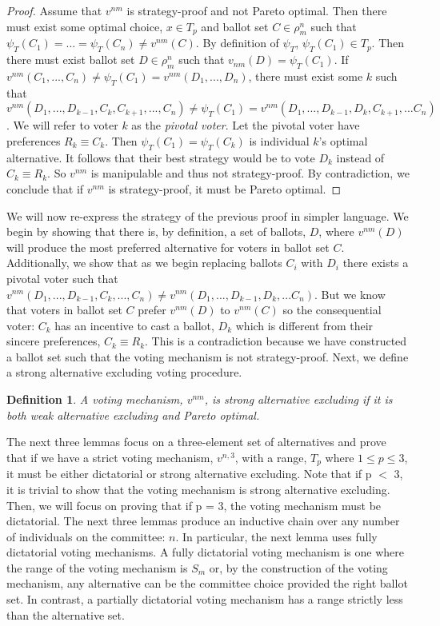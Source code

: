 \documentclass{amsart}
\newtheorem{definition}{Definition}
\theoremstyle{plain}
\begin{document}
\begin{proof}
    
Assume that $v^{nm}$ is strategy-proof and not Pareto optimal. Then there must exist some optimal choice, $x \in T_p$ and ballot set $C \in \rho_m^n$ such that $\psi_T(C_1) = ... = \psi_T(C_n)\ne v^{nm}(C)$. By definition of $\psi_T$, $\psi_T(C_1) \in T_p$. Then there must exist ballot set $D \in \rho_m^n$ such that $v_{nm}(D) = \psi_T(C_1)$. If $v^{nm}(C_1, ... , C_n) \ne \psi_T(C_1) = v^{nm}(D_1, ... , D_n)$, there must exist some $k$ such that $v^{nm}(D_1 , ... , D_{k-1}, C_k, C_{k+1}, ... , C_n) \ne \psi_T(C_1) = v^{nm}(D_1 , ... , D_{k-1}, D_k, C_{k+1}, ... C_n)$. We will refer to voter $k$ as the \emph{pivotal voter}. Let the pivotal voter have preferences $R_k \equiv C_k$. Then $\psi_T(C_1) = \psi_T(C_k)$ is individual $k$'s optimal alternative. It follows that their best strategy would be to vote $D_k$ instead of $C_k \equiv R_k$. So $v^{nm}$ is manipulable and thus not strategy-proof. By contradiction, we conclude that if $v^{nm}$ is strategy-proof, it must be Pareto optimal. 
\end{proof}

We will now re-express the strategy of the previous proof in simpler language. We begin by showing that there is, by definition, a set of ballots, $D$, where $v^{nm}(D)$ will produce the most preferred alternative for voters in ballot set $C$. Additionally, we show that as we begin replacing ballots $C_i$ with $D_i$ there exists a pivotal voter such that $v^{nm}(D_1 , ... , D_{k-1}, C_k, ... , C_n) \ne v^{nm}(D_1 , ... , D_{k-1}, D_k, ... C_n)$. But we know that voters in ballot set $C$ prefer $v^{nm}(D)$ to $v^{nm}(C)$ so the consequential voter: $C_k$ has an incentive to cast a ballot, $D_k$ which is different from their sincere preferences, $C_k \equiv R_k$. This is a contradiction because we have constructed a ballot set such that the voting mechanism is not strategy-proof. Next, we define a strong alternative excluding voting procedure. 

\begin{definition}
    A voting mechanism, $v^{nm}$, is strong alternative excluding if it is both weak alternative excluding and Pareto optimal.
\end{definition}

The next three lemmas focus on a three-element set of alternatives and prove that if we have a strict voting mechanism, $v^{n,3}$, with a range, $T_p$ where $1 \le p \le 3$, it must be either dictatorial or strong alternative excluding. Note that if p $<$ 3, it is trivial to show that the voting mechanism is strong alternative excluding. Then, we will focus on proving that if p = 3, the voting mechanism must be dictatorial. The next three lemmas produce an inductive chain over any number of individuals on the committee: $n$. In particular, the next lemma uses fully dictatorial voting mechanisms. A fully dictatorial voting mechanism is one where the range of the voting mechanism is $S_m$ or, by the construction of the voting mechanism, any alternative can be the committee choice provided the right ballot set. In contrast, a partially dictatorial voting mechanism has a range strictly less than the alternative set. 
\end{document}
